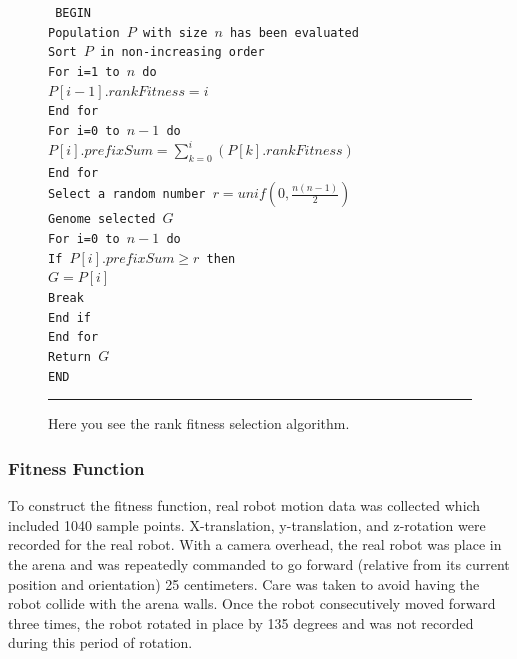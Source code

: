 \begin{figure}[htbp]
\begin{center}
\begin{varwidth}{\textwidth}
{\tt
BEGIN \\
\tab Population $P$ with size $n$ has been evaluated \\
\tab Sort $P$ in non-increasing order \\
\tab For i=1 to $n$ do \\
\tab \tab $P[i-1].rankFitness = i$ \\
\tab End for \\
\tab For i=0 to $n-1$ do \\
\tab \tab $P[i].prefixSum = \sum\limits_{k=0}^i(P[k].rankFitness)$ \\
\tab End for \\
\tab Select a random number $r=unif\left(0,\frac{n(n-1)}{2}\right)$ \\
\tab Genome selected $G$ \\
\tab For i=0 to $n-1$ do \\
\tab \tab If $P[i].prefixSum \geq r $ then \\
\tab \tab \tab $G=P[i]$ \\
\tab \tab \tab Break \\
\tab \tab End if \\
\tab End for \\
\tab Return $G$ \\
END \\
}
\end{varwidth}
\end{center}
\centering
\rule{35em}{0.5pt}
\caption[Rank Fitness Selection Algorithm]{Here you see the rank fitness selection algorithm.}
\label{fig:rank_fitness_selection}
\end{figure}

\subsubsection{Fitness Function}


To construct the fitness function, real robot motion data was collected which included 1040 sample points. X-translation, y-translation, and z-rotation were recorded for the real robot. With a camera overhead, the real robot was place in the arena and was repeatedly commanded to go forward (relative from its current position and orientation) 25 centimeters. Care was taken to avoid having the robot collide with the arena walls. Once the robot consecutively moved forward three times, the robot rotated in place by 135 degrees and was not recorded during this period of rotation.  

